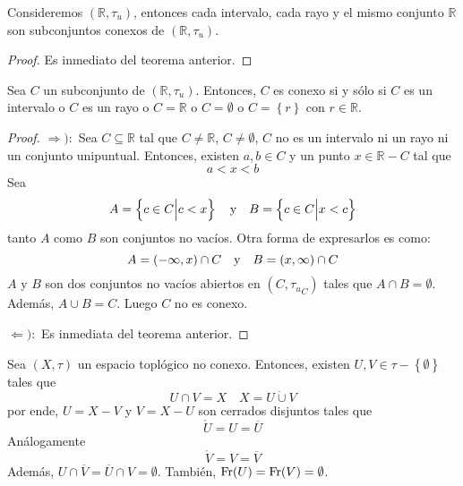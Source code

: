 \documentclass[12pt]{report}
\theoremstyle{largebreak}
\newcommand{\Int}[1]{\ensuremath{\mathring{#1}}}
\newcommand{\Cls}[1]{\ensuremath{\overline{#1}}}
\newcommand{\Fr}[1]{\ensuremath{\textup{Fr}(#1)}}
\begin{document}
    \begin{cor}
        Consideremos $(\mathbb{R},\tau_u)$, entonces cada intervalo, cada rayo y el mismo conjunto $\mathbb{R}$ son subconjuntos conexos de $(\mathbb{R},\tau_u)$.
    \end{cor}

    \begin{proof}
        Es inmediato del teorema anterior.
    \end{proof}

    \begin{propo}
        Sea $C$ un subconjunto de $(\mathbb{R},\tau_u)$. Entonces, $C$ es conexo si y sólo si $C$ es un intervalo o $C$ es un rayo o $C=\mathbb{R}$ o $C=\emptyset$ o $C=\left\{r\right\}$ con $r\in\mathbb{R}$.
    \end{propo}

    \begin{proof}
        $\Rightarrow):$ Sea $C\subseteq\mathbb{R}$ tal que $C\neq\mathbb{R}$, $C\neq\emptyset$, $C$ no es un intervalo ni un rayo ni un conjunto unipuntual. Entonces, existen $a,b\in C$ y un punto $x\in\mathbb{R}-C$ tal que
        \begin{equation*}
            a<x<b
        \end{equation*}
        Sea
        \begin{equation*}
            A=\left\{c\in C\Big|c<x \right\}\quad\textup{y}\quad B=\left\{c\in C\Big|x<c \right\}
        \end{equation*}
        tanto $A$ como $B$ son conjuntos no vacíos. Otra forma de expresarlos es como:
        \begin{equation*}
            A=(-\infty,x)\cap C\quad\textup{y}\quad B=(x,\infty)\cap C
        \end{equation*}
        $A$ y $B$ son dos conjuntos no vacíos abiertos en $(C,{\tau_u}_C)$ tales que $A\cap B=\emptyset$. Además, $A\cup B=C$. Luego $C$ no es conexo. 

        $\Leftarrow):$ Es inmediata del teorema anterior.
    \end{proof}

    \begin{obs}
        Sea $(X,\tau)$ un espacio toplógico no conexo. Entonces, existen $U,V\in\tau-\left\{\emptyset \right\}$ tales que
        \begin{equation*}
            U\cap V=X\quad X=U\dot{\cup}V
        \end{equation*}
        por ende, $U=X-V$ y $V=X-U$ son cerrados disjuntos tales que
        \begin{equation*}
            \Int{U}=U=\Cls{U}
        \end{equation*}
        Análogamente
        \begin{equation*}
            \Int{V}=V=\Cls{V}
        \end{equation*}
        Además, $U\cap\Cls{V}=\Cls{U}\cap V=\emptyset$. También, $\Fr{U}=\Fr{V}=\emptyset$.
    \end{obs}
\end{document}
